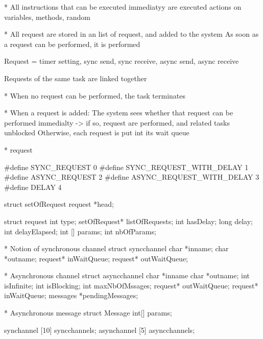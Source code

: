* All instructions that can be executed immediatyy are executed
actions on variables, methods, random


* All request are stored in an list of request, and added to the system
As soon as a request can be performed, it is performed

Request = timer setting, sync send, sync receive, async send, async receive

Requests of the same task are linked together


* When no request can be performed, the task terminates

* When a request is added:
The system sees whether that request can be performed immedialty -> if so, request are performed, and related tasks unblocked
Otherwise, each request is put int its wait queue


* request

#define SYNC_REQUEST 0
#define SYNC_REQUEST_WITH_DELAY 1
#define ASYNC_REQUEST 2
#define ASYNC_REQUEST_WITH_DELAY 3
#define DELAY 4

struct setOfRequest {
  request *head;
}

struct request {
  int type;
  setOfRequest* listOfRequests;
  int hasDelay;
  long delay;
  int delayElapsed;
  int [] params;
  int nbOfParams;
}


* Notion of synchronous channel
struct syncchannel {
  char *inname;
  char *outname;
  request* inWaitQueue;
  request* outWaitQueue; 
}

* Asynchronous channel
struct asyncchannel {
  char *inname
  char *outname;
  int isInfinite;
  int isBlocking;
  int maxNbOfMssages;
  request* outWaitQueue;
  request* inWaitQueue;
  messages *pendingMessages;
}

* Asynchronous message
struct Message {
  int[] params;
}



synchannel [10] syncchannels;
asynchannel [5] asyncchannels;

